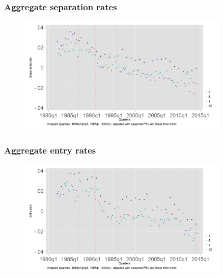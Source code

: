 \documentclass[aspectratio=169]{beamer}
\begin{document}
\begin{frame}
    \frametitle{Aggregate separation rates}

    \begin{figure}[]
        \centering
        \includegraphics[width=0.9\textwidth]{../output/separation_rate_adj_CI.png}
    \end{figure}

\end{frame}

\begin{frame}
    \frametitle{Aggregate entry rates}

    \begin{figure}[]
        \centering
        \includegraphics[width=0.9\textwidth]{../output/accession_rate_adj_CI.png}
    \end{figure}

\end{frame}
\end{document}
